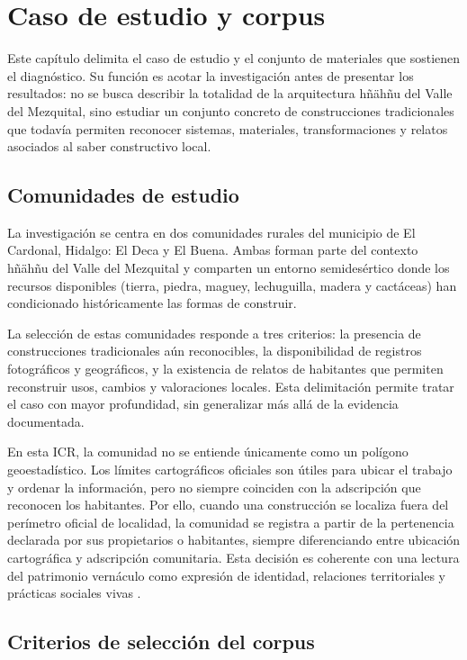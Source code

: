 \section{Caso de estudio y corpus}

Este capítulo delimita el caso de estudio y el conjunto de materiales que sostienen el diagnóstico. Su función es acotar la investigación antes de presentar los resultados: no se busca describir la totalidad de la arquitectura hñähñu del Valle del Mezquital, sino estudiar un conjunto concreto de construcciones tradicionales que todavía permiten reconocer sistemas, materiales, transformaciones y relatos asociados al saber constructivo local.

\subsection{Comunidades de estudio}

La investigación se centra en dos comunidades rurales del municipio de El Cardonal, Hidalgo: El Deca y El Buena. Ambas forman parte del contexto hñähñu del Valle del Mezquital y comparten un entorno semidesértico donde los recursos disponibles (tierra, piedra, maguey, lechuguilla, madera y cactáceas) han condicionado históricamente las formas de construir.

La selección de estas comunidades responde a tres criterios: la presencia de construcciones tradicionales aún reconocibles, la disponibilidad de registros fotográficos y geográficos, y la existencia de relatos de habitantes que permiten reconstruir usos, cambios y valoraciones locales. Esta delimitación permite tratar el caso con mayor profundidad, sin generalizar más allá de la evidencia documentada.

En esta ICR, la comunidad no se entiende únicamente como un polígono geoestadístico. Los límites cartográficos oficiales son útiles para ubicar el trabajo y ordenar la información, pero no siempre coinciden con la adscripción que reconocen los habitantes. Por ello, cuando una construcción se localiza fuera del perímetro oficial de localidad, la comunidad se registra a partir de la pertenencia declarada por sus propietarios o habitantes, siempre diferenciando entre ubicación cartográfica y adscripción comunitaria. Esta decisión es coherente con una lectura del patrimonio vernáculo como expresión de identidad, relaciones territoriales y prácticas sociales vivas \citep{icomos1999carta, moreno2006otomi, cortes2014juventud}.

\subsection{Criterios de selección del corpus}

